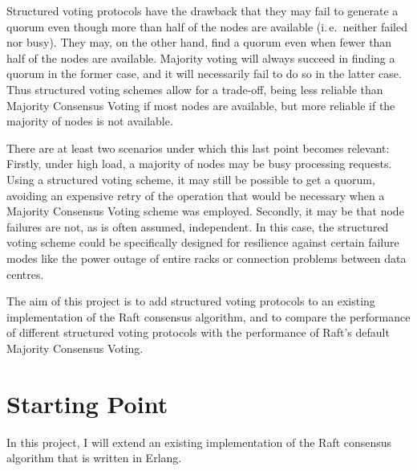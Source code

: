 \documentclass[12pt]{scrartcl}
\begin{document}
Structured voting protocols have the drawback that they may fail to generate a quorum even though more than half of the nodes are available (i.\,e.\ neither failed nor busy). They may, on the other hand, find a quorum even when fewer than half of the nodes are available. Majority voting will always succeed in finding a quorum in the former case, and it will necessarily fail to do so in the latter case. Thus structured voting schemes allow for a trade-off, being less reliable than Majority Consensus Voting if most nodes are available, but more reliable if the majority of nodes is not available.

There are at least two scenarios under which this last point becomes relevant: Firstly, under high load, a majority of nodes may be busy processing requests. Using a structured voting scheme, it may still be possible to get a quorum, avoiding an expensive retry of the operation that would be necessary when a Majority Consensus Voting scheme was employed. Secondly, it may be that node failures are not, as is often assumed, independent. In this case, the structured voting scheme could be specifically designed for resilience against certain failure modes like the power outage of entire racks or connection problems between data centres.

The aim of this project is to add structured voting protocols to an existing implementation of the Raft consensus algorithm, and to compare the performance of different structured voting protocols with the performance of Raft's default Majority Consensus Voting.


\section{Starting Point%
  \label{starting-point}%
}
%

In this project, I will extend an existing implementation of the Raft consensus algorithm that is written in Erlang.
\end{document}
